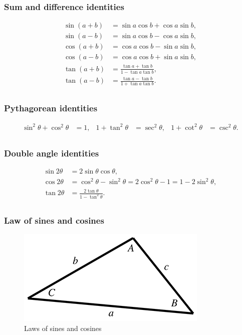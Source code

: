 \documentclass[11pt]{article}
\begin{document}
\subsubsection{Sum and difference identities}

\[\begin{matrix}
{\sin(a + b)} & {= \sin a\cos b + \cos a\sin b,} \\
{\sin(a - b)} & {= \sin a\cos b - \cos a\sin b,} \\
{\cos(a + b)} & {= \cos a\cos b - \sin a\sin b,} \\
{\cos(a - b)} & {= \cos a\cos b + \sin a\sin b,} \\
{\tan(a + b)} & {= \frac{\tan a + \tan b}{1 - \tan a\tan b},} \\
{\tan(a - b)} & {= \frac{\tan a - \tan b}{1 + \tan a\tan b}.} \\
\end{matrix}\]

\subsubsection{Pythagorean identities}

\[\begin{matrix}
{\sin^{2}\theta + \cos^{2}\theta} & {= 1,} & {1 + \tan^{2}\theta} & {= \sec^{2}\theta,} & {1 + \cot^{2}\theta} & {= \csc^{2}\theta.} \\
\end{matrix}\]

\subsubsection{Double angle identities}

\[\begin{matrix}
{\sin 2\theta} & {= 2\sin\theta\cos\theta,} \\
{\cos 2\theta} & {= \cos^{2}\theta - \sin^{2}\theta = 2\cos^{2}\theta - 1 = 1 - 2\sin^{2}\theta,} \\
{\tan 2\theta} & {= \frac{2\tan\theta}{1 - \tan^{2}\theta}.} \\
\end{matrix}\]

\subsubsection{Law of sines and cosines}

\begin{figure}[H]
\centering
    \includegraphics{01_laws}
\caption{Laws of sines and cosines}
\label{fig:laws-of-sines-and-cosines}
\end{figure}
\end{document}

